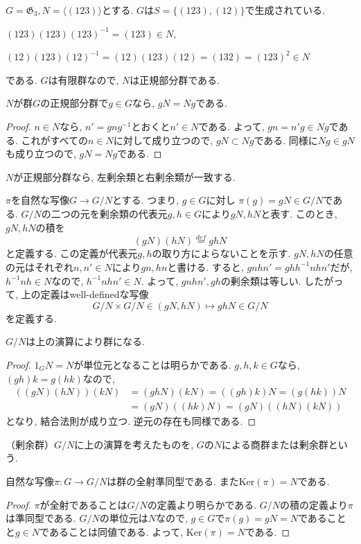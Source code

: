 $G=\mathfrak{G}_3, N=\langle (123) \rangle$とする.
$G$は$S=\{(123),(12)\}$で生成されている.

\quad $(123)(123)(123)^{-1}=(123) \in N,$ 

\quad $(12)(123)(12)^{-1}=(12)(123)(12)=(132)=(123)^2 \in N$

である. $G$は有限群なので, $N$は正規部分群である.\newline

$N$が群$G$の正規部分群で$g \in G$なら, $gN=Ng$である.
\begin{proof}
  $n\in N$なら, $n'=gng^{-1}$とおくと$n'\in N$である.
  よって, $gn=n'g \in Ng$である.
  これがすべての$n \in N$に対して成り立つので, $gN\subset Ng$である.
  同様に$Ng\in gN$も成り立つので, $gN=Ng$である.
\end{proof}
$N$が正規部分群なら, 左剰余類と右剰余類が一致する.

$\pi$を自然な写像$G\to G/N$とする. つまり, $g \in G$に対し
$\pi(g)=gN \in G/N$である.
$G/N$の二つの元を剰余類の代表元$g,h \in G$により$gN,hN$と表す.
このとき, $gN,hN$の積を
\[(gN)(hN)\overset{def}{=}ghN\]
と定義する. この定義が代表元$g,h$の取り方によらないことを示す.
$gN,hN$の任意の元はそれぞれ$n,n'\in N$により$gn,hn$と書ける.
すると, $gnhn'=ghh^{-1}nhn'$だが, $h^{-1}nh \in N$なので,
$h^{-1}nhn' \in N$. よって, $gnhn',gh$の剰余類は等しい.
したがって, 上の定義はwell-definedな写像
\[G/N\times G/N \in (gN,hN) \mapsto ghN \in G/N\]
を定義する.

\begin{tcolorbox}
	\begin{thm*}
		$G/N$は上の演算により群になる.
	\end{thm*}	
\end{tcolorbox}
\begin{proof}
	$1_GN=N$が単位元となることは明らかである.
	$g,h,k \in G$なら, $(gh)k=g(hk)$なので,
	\begin{align*}
		((gN)(hN))(kN) &= (ghN)(kN)=((gh)k)N=(g(hk))N\\
		&=(gN)((hk)N)=(gN)((hN)(kN))
	\end{align*}
	となり, 結合法則が成り立つ. 逆元の存在も同様である.
\end{proof}\leavevmode

\begin{dfn*}
	（剰余群）$G/N$に上の演算を考えたものを, $G$の$N$による商群または剰余群という.
\end{dfn*}

\begin{tcolorbox}
	\begin{prp*}
		自然な写像$\pi: G \to G/N$は群の全射準同型である.
		また$\mathrm{Ker}(\pi)=N$である.
	\end{prp*}
\end{tcolorbox}
\begin{proof}
	$\pi$が全射であることは$G/N$の定義より明らかである.
	$G/N$の積の定義より$\pi$は準同型である. $G/N$の単位元は$N$なので,
	$g\in G$で$\pi(g)=gN=N$であることと$g\in N$であることは同値である.
	よって, $\mathrm{Ker}(\pi)=N$である.
\end{proof}\leavevmode

